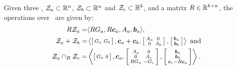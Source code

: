 \documentclass{ifacconf}
\begin{document}
Given three \czs, ${\mathcal{Z}_a\subset\mathbb{R}^{n}}$, ${\mathcal{Z}_b\subset\mathbb{R}^{n}}$ and ${\mathcal{Z}_c \subset \mathbb{R}^k}$, and a matrix ${R\in\mathbb{R}^{k\times n}}$,
the operations over \czs\ are given by:
\begin{align}
  R\mathcal{Z}_a=&\langle RG_a,R\boldsymbol{c}_a, A_a,\boldsymbol{b}_a\rangle,\\
  \mathcal{Z}_a + \mathcal{Z}_b=&\left\langle
                          \left[\begin{smallmatrix}
                            G_a&
                                 G_b
                          \end{smallmatrix}\right] ,\boldsymbol{c}_a+\boldsymbol{c}_b, \left[\begin{smallmatrix}
                            A_a& 0\\
                            0  & A_b
                          \end{smallmatrix}\right],
                          \left[\begin{smallmatrix}
                            \boldsymbol{b}_a\\
                            \boldsymbol{b}_b
                          \end{smallmatrix}\right]
                          \right\rangle\text{ and}\\
  \mathcal{Z}_a\cap_R \mathcal{Z}_c=&\left\langle
                              \left[\begin{smallmatrix}
                                G_a&
                                     0
                              \end{smallmatrix}\right] ,\boldsymbol{c}_a, \left[\begin{smallmatrix}
                                A_a & 0\\
                                0   & A_c\\
                                RG_a&  -G_c
                              \end{smallmatrix}\right],
                              \left[\begin{smallmatrix}
                                \boldsymbol{b}_a\\
                                \boldsymbol{b}_b\\
                                \boldsymbol{c}_c-R\boldsymbol{c}_a
                              \end{smallmatrix}\right]
                              \right\rangle.\label{eq:generalized_intersection}
\end{align}
\end{document}
